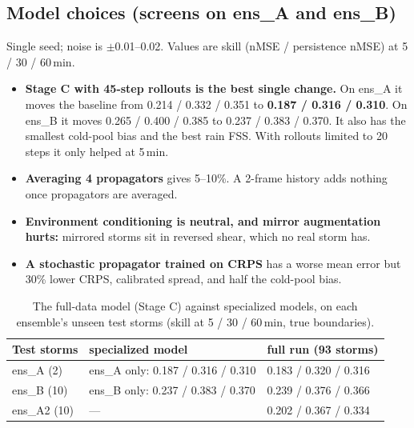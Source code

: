 \documentclass[11pt]{article}
\begin{document}
\subsection{Model choices (screens on ens\_A and ens\_B)}
Single seed; noise is $\pm$0.01--0.02. Values are skill (nMSE / persistence nMSE) at 5 / 30 / 60\,min.
\begin{itemize}
\item \textbf{Stage C with 45-step rollouts is the best single change.} On ens\_A it moves the baseline from 0.214 / 0.332 / 0.351 to \textbf{0.187 / 0.316 / 0.310}. On ens\_B it moves 0.265 / 0.400 / 0.385 to 0.237 / 0.383 / 0.370. It also has the smallest cold-pool bias and the best rain FSS. With rollouts limited to 20 steps it only helped at 5\,min.
\item \textbf{Averaging 4 propagators} gives 5--10\%. A 2-frame history adds nothing once propagators are averaged.
\item \textbf{Environment conditioning is neutral, and mirror augmentation hurts:} mirrored storms sit in reversed shear, which no real storm has.
\item \textbf{A stochastic propagator trained on CRPS} has a worse mean error but 30\% lower CRPS, calibrated spread, and half the cold-pool bias.
\end{itemize}

\begin{table}[htbp]\centering\small
\caption{The full-data model (Stage C) against specialized models, on each ensemble's unseen test storms (skill at 5 / 30 / 60\,min, true boundaries).}\label{tab:ens}
\begin{tabular}{lll}\toprule
Test storms & specialized model & full run (93 storms)\\\midrule
ens\_A (2) & ens\_A only: 0.187 / 0.316 / 0.310 & 0.183 / 0.320 / 0.316\\
ens\_B (10) & ens\_B only: 0.237 / 0.383 / 0.370 & 0.239 / 0.376 / 0.366\\
ens\_A2 (10) & --- & 0.202 / 0.367 / 0.334\\\bottomrule
\end{tabular}\end{table}
\end{document}

